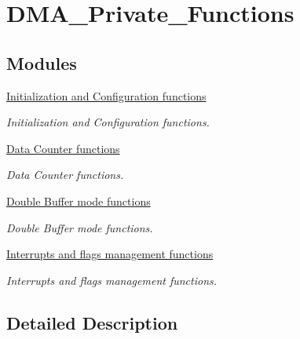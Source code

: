 \hypertarget{group___d_m_a___private___functions}{}\section{D\+M\+A\+\_\+\+Private\+\_\+\+Functions}
\label{group___d_m_a___private___functions}
\subsection*{Modules}
\begin{DoxyCompactItemize}
\item 
\hyperlink{group___d_m_a___group1}{Initialization and Configuration functions}
\begin{DoxyCompactList}\small\item\em Initialization and Configuration functions. \end{DoxyCompactList}\item 
\hyperlink{group___d_m_a___group2}{Data Counter functions}
\begin{DoxyCompactList}\small\item\em Data Counter functions. \end{DoxyCompactList}\item 
\hyperlink{group___d_m_a___group3}{Double Buffer mode functions}
\begin{DoxyCompactList}\small\item\em Double Buffer mode functions. \end{DoxyCompactList}\item 
\hyperlink{group___d_m_a___group4}{Interrupts and flags management functions}
\begin{DoxyCompactList}\small\item\em Interrupts and flags management functions. \end{DoxyCompactList}\end{DoxyCompactItemize}


\subsection{Detailed Description}
